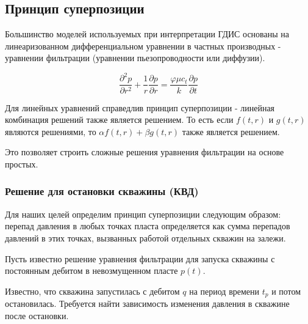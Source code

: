 %
%
%
%

\subsection{Принцип суперпозиции}

Большинство моделей используемых при интерпретации ГДИС основаны на линеаризованном дифференциальном уравнении в частных производных - уравнении фильтрации (уравнении пьезопроводности или диффузии).

$$ \frac{\partial ^2 p }{\partial r^2} + \frac{1}{r} \frac{\partial p}{\partial r} = \frac{\varphi \mu c_t}{k} \frac{\partial p}{\partial t} $$

Для линейных уравнений справедлив принцип суперпозиции - линейная комбинация решений также является решением. То есть если $f(t,r)$ и $g(t,r)$ являются решениями, то $\alpha f(t,r) + \beta g(t,r)$  также является решением.

Это позволяет строить сложные решения уравнения фильтрации на основе простых.

\subsubsection{Решение для остановки скважины (КВД)}

Для наших целей определим принцип суперпозиции следующим образом: перепад давления в любых точках пласта определяется как сумма перепадов давлений в этих точках, вызванных работой отдельных скважин на залежи. 

Пусть известно решение уравнения фильтрации для запуска скважины с постоянным дебитом в невозмущенном пласте   $p(t)$. 

Известно, что скважина запустилась с дебитом $q$ на период времени $t_p$ и потом остановилась. Требуется найти зависимость изменения давления в скважине после остановки.

